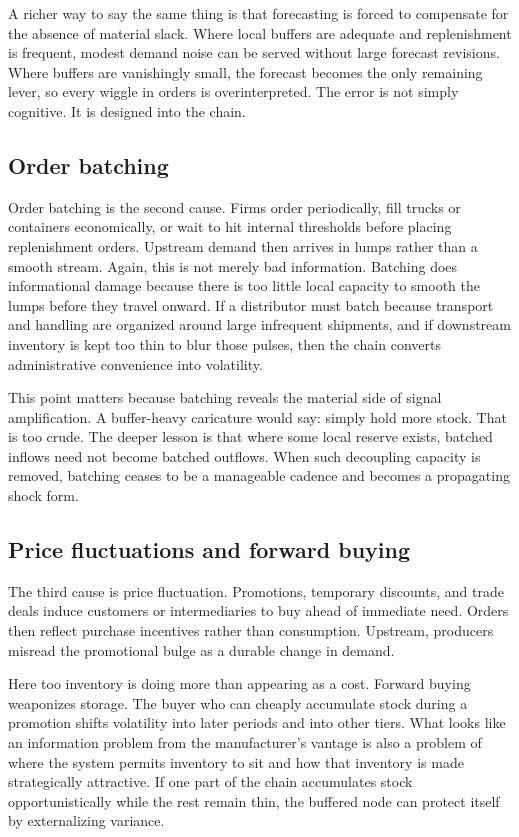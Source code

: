 \documentclass[11pt]{article}
\begin{document}
A richer way to say the same thing is that forecasting is forced to compensate for the absence of material slack. Where local buffers are adequate and replenishment is frequent, modest demand noise can be served without large forecast revisions. Where buffers are vanishingly small, the forecast becomes the only remaining lever, so every wiggle in orders is overinterpreted. The error is not simply cognitive. It is designed into the chain.

\subsection*{Order batching}
Order batching is the second cause. Firms order periodically, fill trucks or containers economically, or wait to hit internal thresholds before placing replenishment orders. Upstream demand then arrives in lumps rather than a smooth stream. Again, this is not merely bad information. Batching does informational damage because there is too little local capacity to smooth the lumps before they travel onward. If a distributor must batch because transport and handling are organized around large infrequent shipments, and if downstream inventory is kept too thin to blur those pulses, then the chain converts administrative convenience into volatility.

This point matters because batching reveals the material side of signal amplification. A buffer-heavy caricature would say: simply hold more stock. That is too crude. The deeper lesson is that where some local reserve exists, batched inflows need not become batched outflows. When such decoupling capacity is removed, batching ceases to be a manageable cadence and becomes a propagating shock form.

\subsection*{Price fluctuations and forward buying}
The third cause is price fluctuation. Promotions, temporary discounts, and trade deals induce customers or intermediaries to buy ahead of immediate need. Orders then reflect purchase incentives rather than consumption. Upstream, producers misread the promotional bulge as a durable change in demand.

Here too inventory is doing more than appearing as a cost. Forward buying weaponizes storage. The buyer who can cheaply accumulate stock during a promotion shifts volatility into later periods and into other tiers. What looks like an information problem from the manufacturer's vantage is also a problem of where the system permits inventory to sit and how that inventory is made strategically attractive. If one part of the chain accumulates stock opportunistically while the rest remain thin, the buffered node can protect itself by externalizing variance.
\end{document}
